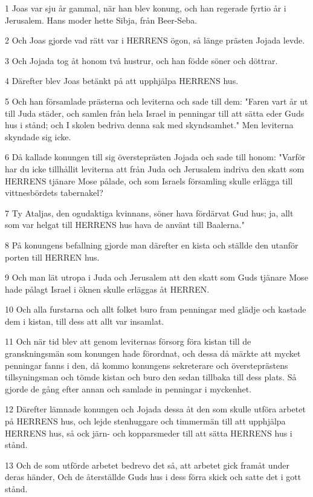 \par 1 Joas var sju år gammal, när han blev konung, och han regerade fyrtio år i Jerusalem. Hans moder hette Sibja, från Beer-Seba.
\par 2 Och Joas gjorde vad rätt var i HERRENS ögon, så länge prästen Jojada levde.
\par 3 Och Jojada tog åt honom två hustrur, och han födde söner och döttrar.
\par 4 Därefter blev Joas betänkt på att upphjälpa HERRENS hus.
\par 5 Och han församlade prästerna och leviterna och sade till dem: "Faren vart år ut till Juda städer, och samlen från hela Israel in penningar till att sätta eder Guds hus i stånd; och I skolen bedriva denna sak med skyndsamhet." Men leviterna skyndade sig icke.
\par 6 Då kallade konungen till sig översteprästen Jojada och sade till honom: "Varför har du icke tillhållit leviterna att från Juda och Jerusalem indriva den skatt som HERRENS tjänare Mose pålade, och som Israels församling skulle erlägga till vittnesbördets tabernakel?
\par 7 Ty Ataljas, den ogudaktiga kvinnans, söner hava fördärvat Gud hus; ja, allt som var helgat till HERRENS hus hava de använt till Baalerna."
\par 8 På konungens befallning gjorde man därefter en kista och ställde den utanför porten till HERREN hus.
\par 9 Och man lät utropa i Juda och Jerusalem att den skatt som Guds tjänare Mose hade pålagt Israel i öknen skulle erläggas åt HERREN.
\par 10 Och alla furstarna och allt folket buro fram penningar med glädje och kastade dem i kistan, till dess att allt var insamlat.
\par 11 Och när tid blev att genom leviternas försorg föra kistan till de granskningsmän som konungen hade förordnat, och dessa då märkte att mycket penningar fanns i den, då kommo konungens sekreterare och översteprästens tillsyningsman och tömde kistan och buro den sedan tillbaka till dess plats. Så gjorde de gång efter annan och samlade in penningar i myckenhet.
\par 12 Därefter lämnade konungen och Jojada dessa åt den som skulle utföra arbetet på HERRENS hus, och lejde stenhuggare och timmermän till att upphjälpa HERRENS hus, så ock järn- och kopparsmeder till att sätta HERRENS hus i stånd.
\par 13 Och de som utförde arbetet bedrevo det så, att arbetet gick framåt under deras händer, Och de återställde Guds hus i dess förra skick och satte det i gott stånd.
